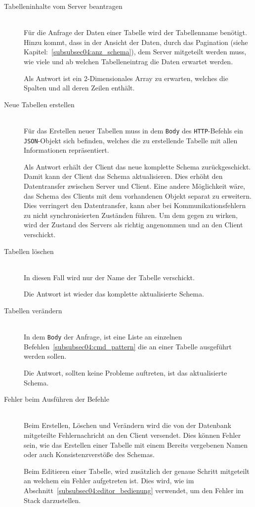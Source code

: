 \begin{description}
\item[Tabelleninhalte vom Server beantragen] \hfill\\
Für die Anfrage der Daten einer Tabelle wird der Tabellenname benötigt. Hinzu kommt, dass in der Ansicht der Daten, durch das Pagination (siehe Kapitel:~\ref{subsubsec04:anz_schema}), dem Server mitgeteilt werden muss, wie viele und ab welchen Tabelleneintrag die Daten erwartet werden.

Als Antwort ist ein 2-Dimensionales Array zu erwarten, welches die Spalten und all deren Zeilen enthält.

\item[Neue Tabellen erstellen] \hfill\\
Für das Erstellen neuer Tabellen muss in dem \texttt{Body} des \texttt{HTTP}-Befehls ein \texttt{JSON}-Objekt sich befinden, welches die zu erstellende Tabelle mit allen Informationen repräsentiert.

Als Antwort erhält der Client das neue komplette Schema zurückgeschickt. Damit kann der Client das Schema aktualisieren.
Dies erhöht den Datentransfer zwischen Server und Client. Eine andere Möglichkeit wäre, das Schema des Clients mit dem vorhandenen Objekt separat zu erweitern. Dies verringert den Datentransfer, kann aber bei Kommunikationsfehlern zu nicht synchronisierten Zuständen führen. Um dem gegen zu wirken, wird der Zustand des Servers als richtig angenommen und an den Client verschickt.

\item[Tabellen löschen] \hfill\\
In diesen Fall wird nur der Name der Tabelle verschickt. 

Die Antwort ist wieder das komplette aktualisierte Schema.

\item[Tabellen verändern] \hfill\\
In dem \texttt{Body} der Anfrage, ist eine Liste an einzelnen Befehlen~\ref{subsubsec04:cmd_pattern} die an einer Tabelle ausgeführt werden sollen.

Die Antwort, sollten keine Probleme auftreten, ist das aktualisierte Schema.

\item[Fehler beim Ausführen der Befehle] \hfill\\
Beim Erstellen, Löschen und Verändern wird die von der Datenbank mitgeteilte Fehlernachricht an den Client versendet.
Dies können Fehler sein, wie das Erstellen einer Tabelle mit einem Bereits vergebenen Namen oder auch Konsistenzverstöße des Schemas.

Beim Editieren einer Tabelle, wird zusätzlich der genaue Schritt mitgeteilt an welchem ein Fehler aufgetreten ist. Dies wird, wie im Abschnitt~\ref{subsubsec04:editor_bedienung} verwendet, um den Fehler im Stack darzustellen.
\end{description}


